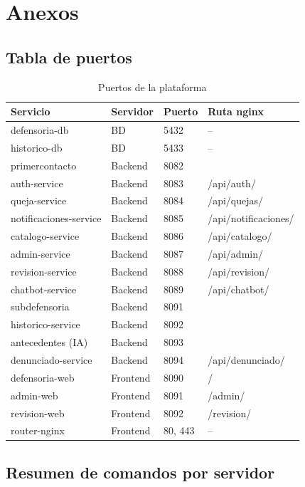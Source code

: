 \section{Anexos}\label{sec:anexos}

\subsection{Tabla de puertos}
\begin{table}[H]
\centering
\caption{Puertos de la plataforma}
\begin{tabular}{llll}
\toprule
\textbf{Servicio} & \textbf{Servidor} & \textbf{Puerto} & \textbf{Ruta nginx} \\
\midrule
defensoria-db & BD & 5432 & -- \\
historico-db & BD & 5433 & -- \\
primercontacto & Backend & 8082 & \pendiente{} \\
auth-service & Backend & 8083 & /api/auth/ \\
queja-service & Backend & 8084 & /api/quejas/ \\
notificaciones-service & Backend & 8085 & /api/notificaciones/ \\
catalogo-service & Backend & 8086 & /api/catalogo/ \\
admin-service & Backend & 8087 & /api/admin/ \\
revision-service & Backend & 8088 & /api/revision/ \\
chatbot-service & Backend & 8089 & /api/chatbot/ \\
subdefensoria & Backend & 8091 & \pendiente{} \\
historico-service & Backend & 8092 & \pendiente{} \\
antecedentes (IA) & Backend & 8093 & \pendiente{} \\
denunciado-service & Backend & 8094 & /api/denunciado/ \\
defensoria-web & Frontend & 8090 & / \\
admin-web & Frontend & 8091 & /admin/ \\
revision-web & Frontend & 8092 & /revision/ \\
router-nginx & Frontend & 80, 443 & -- \\
\bottomrule
\end{tabular}
\end{table}

\subsection{Resumen de comandos por servidor}

